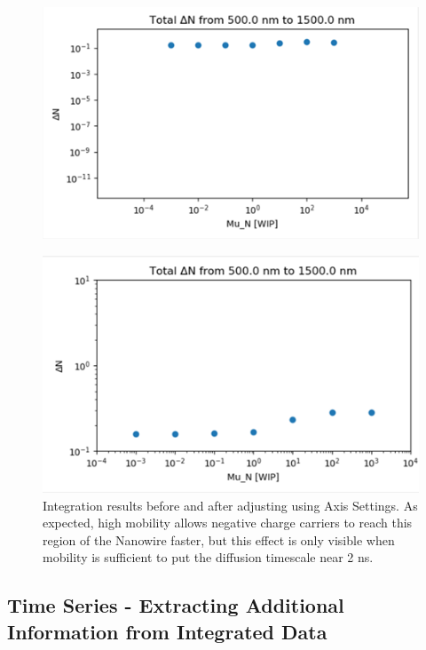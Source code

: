 \documentclass[11pt,letterpaper,titlepage]{article}
\begin{document}
		\begin{figure}[H]
			\label{fig:integration_result}
			\centering
			\includegraphics{"integration_result"}
		\end{figure}
	
		\begin{figure}[H]
			\label{fig:integration_result_adj}
			\centering
			\includegraphics{"integration_result_adj"}
			\caption{Integration results before and after adjusting using Axis Settings. As expected, high mobility allows negative charge carriers to reach this region of the Nanowire faster, but this effect is only visible when mobility is sufficient to put the diffusion timescale near 2 ns.}
		\end{figure}
	
		\subsection{Time Series - Extracting Additional Information from Integrated Data}
		
\end{document}
